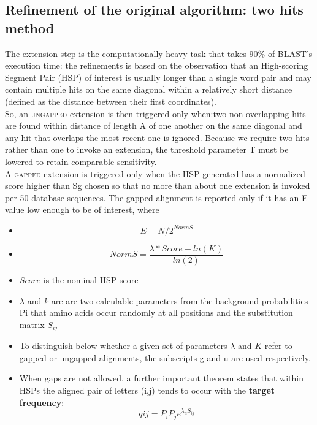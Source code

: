         \subsection{Refinement of the original algorithm: two hits method} \label{refinement}
        The extension step is the computationally heavy task that takes 90\% of BLAST's execution time: the refinements is based on the observation that an High-scoring Segment Pair (HSP) of interest is usually longer than a single word pair and may contain multiple hits on the same diagonal within a relatively short distance (defined as the distance between their first coordinates). \\
        So, an \textsc{ungapped} extension is then triggered only when:two non-overlapping hits are
        found within distance of length A of one another on the same diagonal and any hit that overlaps the most recent one is ignored. Because we require two hits rather than one to invoke an extension, the threshold parameter T must be lowered to retain comparable sensitivity. \\
        A \textsc{gapped} extension is triggered only when the HSP generated has a normalized score higher than S{g} chosen so that no more
        than about one extension is invoked per 50 database sequences. The gapped alignment is reported only if it has an E-value low enough to be of interest, where
        \begin{itemize}
            \item $$  E = N/2^{NormS} $$
            \item $$ NormS = \frac{\lambda * Score - ln(K)}{ln(2)} $$
            \item $Score$ is the nominal HSP score
            \item $ \lambda $ and $k$ are are two calculable parameters from the background probabilities P{i} that amino acids occur randomly at all positions and the substitution matrix $S_{ij}$
            \item To distinguish below whether a given set of parameters $\lambda$ and $K$ refer to gapped or ungapped alignments, the subscripts g and u are used respectively.
            \item  When gaps are not allowed, a further important theorem states that within HSPs the aligned pair of letters (i,j) tends to occur with the \textbf{target frequency}:
            $$ q{ij} = P_iP_je^{\lambda_uS_{ij}} $$
        \end{itemize}



